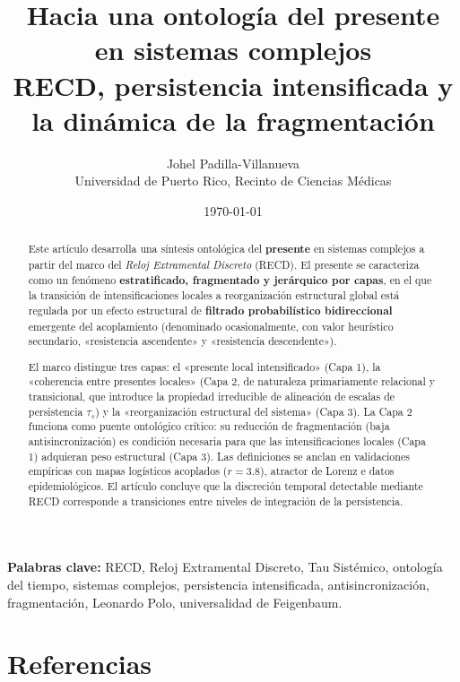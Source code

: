 \documentclass[11pt,a4paper]{article}
\title{\textbf{Hacia una ontología del presente en sistemas complejos}\\[0.3em]
\large RECD, persistencia intensificada y la dinámica de la fragmentación}
\author{Johel Padilla-Villanueva\\
\small Universidad de Puerto Rico, Recinto de Ciencias Médicas}
\date{\today}
\begin{document}
\maketitle

\begin{abstract}
Este artículo desarrolla una síntesis ontológica del \textbf{presente} en sistemas complejos a partir del marco del \textit{Reloj Extramental Discreto} (RECD). El presente se caracteriza como un fenómeno \textbf{estratificado, fragmentado y jerárquico por capas}, en el que la transición de intensificaciones locales a reorganización estructural global está regulada por un efecto estructural de \textbf{filtrado probabilístico bidireccional} emergente del acoplamiento (denominado ocasionalmente, con valor heurístico secundario, «resistencia ascendente» y «resistencia descendente»).

El marco distingue tres capas: el «presente local intensificado» (Capa 1), la «coherencia entre presentes locales» (Capa 2, de naturaleza primariamente relacional y transicional, que introduce la propiedad irreducible de alineación de escalas de persistencia $\tau_s$) y la «reorganización estructural del sistema» (Capa 3). La Capa 2 funciona como puente ontológico crítico: su reducción de fragmentación (baja antisincronización) es condición necesaria para que las intensificaciones locales (Capa 1) adquieran peso estructural (Capa 3). Las definiciones se anclan en validaciones empíricas con mapas logísticos acoplados ($r=3.8$), atractor de Lorenz e datos epidemiológicos. El artículo concluye que la discreción temporal detectable mediante RECD corresponde a transiciones entre niveles de integración de la persistencia.
\end{abstract}

\noindent\textbf{Palabras clave:} RECD, Reloj Extramental Discreto, Tau Sistémico, ontología del tiempo, sistemas complejos, persistencia intensificada, antisincronización, fragmentación, Leonardo Polo, universalidad de Feigenbaum.

\newpage
\tableofcontents
\newpage










\section*{Referencias}

\sloppy

\normalfont
\end{document}

